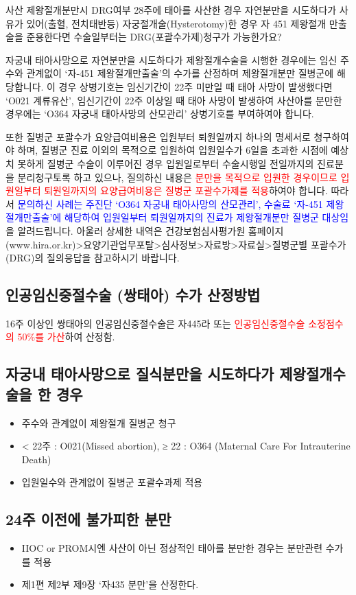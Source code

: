 \begin{commentbox}{사산 제왕절개분만시 DRG여부}
28주에 태아를 사산한 경우 자연분만을 시도하다가 사유가 있어(출혈, 전치태반등) 자궁절개술(Hysterotomy)한 경우 자 451 제왕절개 만출술을 준용한다면 수술일부터는 DRG(포괄수가제)청구가 가능한가요?
\par
\medskip
자궁내 태아사망으로 자연분만을 시도하다가 제왕절개수술을 시행한 경우에는 임신 주수와 관계없이 ‘자-451 제왕절개만출술’의 수가를 산정하며 제왕절개분만 질병군에 해당합니다.
이 경우 상병기호는 임신기간이 22주 미만일 때 태아 사망이 발생했다면 ‘O021 계류유산’, 임신기간이 22주 이상일 때 태아 사망이 발생하여 사산아를 분만한 경우에는 ‘O364 자궁내 태아사망의 산모관리’ 상병기호를 부여하여야 합니다.\par

또한 질병군 포괄수가 요양급여비용은 입원부터 퇴원일까지 하나의 명세서로 청구하여야 하며, 질병군 진료 이외의 목적으로 입원하여 입원일수가 6일을 초과한 시점에 예상치 못하게 질병군 수술이 이루어진 경우 입원일로부터 수술시행일 전일까지의 진료분을 분리청구토록 하고 있으나, 질의하신 내용은 \textcolor{red}{분만을 목적으로 입원한 경우이므로 입원일부터 퇴원일까지의 요양급여비용은 질병군 포괄수가제를 적용}하여야 합니다. 따라서 \textcolor{blue}{문의하신 사례는 주진단 ‘O364 자궁내 태아사망의 산모관리’, 수술료 ‘자-451 제왕절개만출술’에 해당하여 입원일부터 퇴원일까지의 진료가 제왕절개분만 질병군 대상임}을 알려드립니다. 아울러 상세한 내역은 건강보험심사평가원 홈페이지(www.hira.or.kr)>요양기관업무포탈>심사정보>자료방>자료실>질병군별 포괄수가(DRG)의 질의응답을 참고하시기 바랍니다. 
\end{commentbox}
\prezi{\clearpage}
\subsection{인공임신중절수술 (쌍태아) 수가 산정방법}
16주 이상인 쌍태아의 인공임신중절수술은 자445라 또는 \textcolor{red}{인공임신중절수술 소정점수의 50\%를 가산}하여 산정함.
\prezi{\clearpage}
\subsection{자궁내 태아사망으로 질식분만을 시도하다가 제왕절개수술을 한 경우}
\begin{itemize}\tightlist
\item 주수와 관계없이 제왕절개 질병군 청구
\item < 22주 : O021(Missed abortion), ≥ 22 : O364 (Maternal Care For Intrauterine Death)
\item 입원일수와 관계없이 질병군 포괄수과제 적용
\end{itemize}
\prezi{\clearpage}
\subsection{24주 이전에 불가피한 분만}
\begin{itemize}\tightlist
\item IIOC or PROM시엔 사산이 아닌 정상적인 태아를 분만한 경우는 분만관련 수가를 적용
\item 제1편 제2부 제9장 `자435 분만'을 산정한다.
\end{itemize}
